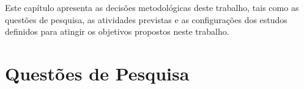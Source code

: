Este capítulo apresenta as decisões metodológicas deste trabalho, tais como as questões de pesquisa, as atividades previstas e as configurações dos estudos definidos para atingir os objetivos propostos neste trabalho. 




\section{Questões de Pesquisa}
\label{sec:questoespesquisa}

